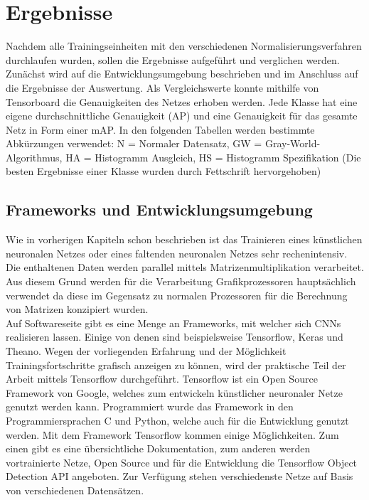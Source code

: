 \documentclass[a4paper,12pt,oneside]{article}
\begin{document}
  \section{Ergebnisse}
Nachdem alle Trainingseinheiten mit den verschiedenen Normalisierungsverfahren durchlaufen wurden, sollen die Ergebnisse aufgeführt und verglichen werden. Zunächst wird auf die Entwicklungsumgebung beschrieben und im Anschluss auf die Ergebnisse der Auswertung. Als Vergleichswerte konnte mithilfe von Tensorboard die Genauigkeiten des Netzes erhoben werden. Jede Klasse hat eine eigene durchschnittliche Genauigkeit (AP) und eine Genauigkeit für das gesamte Netz in Form einer mAP. In den folgenden Tabellen werden bestimmte Abkürzungen verwendet: N = Normaler Datensatz, GW = Gray-World-Algorithmus, HA = Histogramm Ausgleich, HS = Histogramm Spezifikation (Die besten Ergebnisse einer Klasse wurden durch Fettschrift hervorgehoben) 
\subsection{Frameworks und Entwicklungsumgebung}\label{s.entwicklung}
Wie in vorherigen Kapiteln schon beschrieben ist das Trainieren eines künstlichen neuronalen Netzes oder eines faltenden neuronalen Netzes sehr rechenintensiv. Die enthaltenen Daten werden parallel mittels Matrizenmultiplikation verarbeitet. Aus diesem Grund werden für die Verarbeitung Grafikprozessoren hauptsächlich verwendet da diese im Gegensatz zu normalen Prozessoren für die Berechnung von Matrizen konzipiert wurden.\\
Auf Softwareseite gibt es eine Menge an Frameworks, mit welcher sich CNNs realisieren lassen. Einige von denen sind beispielsweise Tensorflow, Keras und Theano. Wegen der vorliegenden Erfahrung und der Möglichkeit Trainingsfortschritte grafisch anzeigen zu können, wird der praktische Teil der Arbeit mittels Tensorflow durchgeführt. Tensorflow ist ein Open Source Framework von Google, welches zum entwickeln künstlicher neuronaler Netze genutzt werden kann. Programmiert wurde das Framework in den Programmiersprachen C und Python, welche auch für die Entwicklung genutzt werden. Mit dem Framework Tensorflow kommen einige Möglichkeiten. Zum einen gibt es eine übersichtliche Dokumentation, zum anderen werden vortrainierte Netze, Open Source und für die Entwicklung die Tensorflow Object Detection API angeboten. Zur Verfügung stehen verschiedenste Netze auf Basis von verschiedenen Datensätzen.
\end{document}
